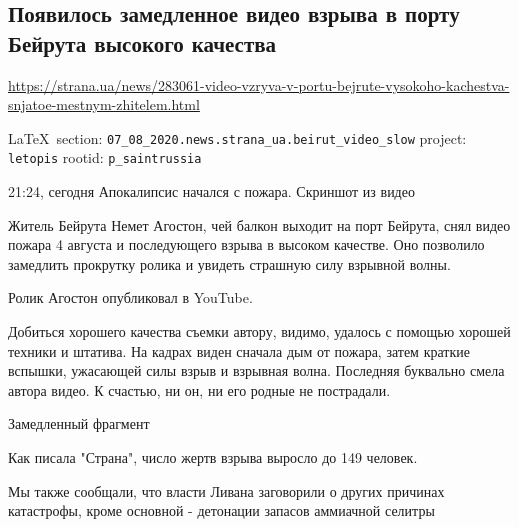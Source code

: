  
 
\subsection{Появилось замедленное видео взрыва в порту Бейрута высокого качества}
\url{https://strana.ua/news/283061-video-vzryva-v-portu-bejrute-vysokoho-kachestva-snjatoe-mestnym-zhitelem.html}

  
\vspace{0.5cm}
 {\ifDEBUG\small\LaTeX~section: \verb|07_08_2020.news.strana_ua.beirut_video_slow| project: \verb|letopis| rootid: \verb|p_saintrussia| \fi}
\vspace{0.5cm}

21:24, сегодня Апокалипсис начался с пожара. Скриншот из видео 

Житель Бейрута Немет Агостон, чей балкон выходит на порт Бейрута, снял видео
пожара 4 августа и последующего взрыва в высоком качестве. Оно позволило
замедлить прокрутку ролика и увидеть страшную силу взрывной волны.

Ролик Агостон опубликовал в YouTube.

Добиться хорошего качества съемки автору, видимо, удалось с помощью хорошей
техники и штатива. На кадрах виден сначала дым от пожара, затем краткие
вспышки, ужасающей силы взрыв и взрывная волна. Последняя буквально смела
автора видео. К счастью, ни он, ни его родные не пострадали.

Замедленный фрагмент

Как писала "Страна", число жертв взрыва выросло до 149 человек.

Мы также сообщали, что власти Ливана заговорили о других причинах катастрофы,
кроме основной - детонации запасов аммиачной селитры
  
